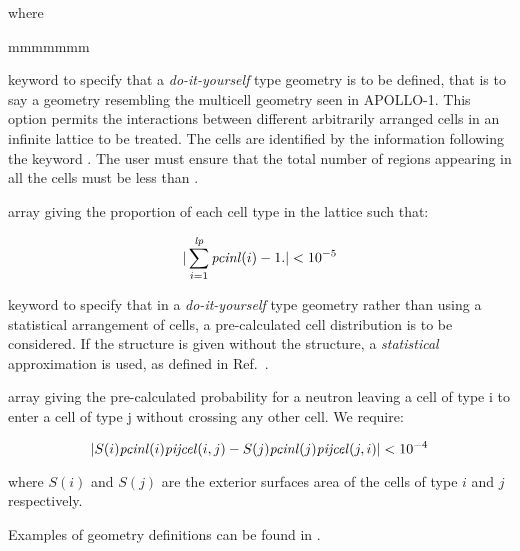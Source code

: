 \noindent where
\begin{ListeDeDescription}{mmmmmmm}

\item[\moc{POURCE}] keyword to specify that a {\sl do-it-yourself} type
geometry is to be defined, that is to say a geometry resembling the multicell
geometry seen in APOLLO-1.\cite{apollo1} This option permits the interactions
between different arbitrarily arranged cells in an infinite lattice to be
treated. The cells are identified by the information
following the keyword . The user must ensure that the total number of
regions appearing in all the cells must be less than .

\item[\dusa{pcinl}] array giving the proportion of each cell type in the
lattice such that:

$$|\sum_{i=1}^{{\it lp}}{\it pcinl}(i)-1.|<10^{-5}$$

\item[\moc{PROCEL}] keyword to specify that in a {\sl do-it-yourself} type
geometry rather than using a statistical arrangement of cells, a pre-calculated
cell distribution is to be considered. If the  structure is
given without the  structure, a {\sl statistical} approximation
is used, as defined in Ref.~.

\item[\dusa{pijcel}] array giving the pre-calculated probability for a neutron
leaving a cell of type i to enter a cell of type j without crossing any other
cell. We require: 

$$|S(i){\it pcinl}(i){\it pijcel}(i,j)-S(j){\it pcinl}(j) {\it
pijcel}(j,i)|<10^{-4}$$

\noindent where $S(i)$ and $S(j)$ are the exterior surfaces area of the cells of
type $i$ and $j$ respectively.

\end{ListeDeDescription}

Examples of geometry definitions can be found in .

\eject
